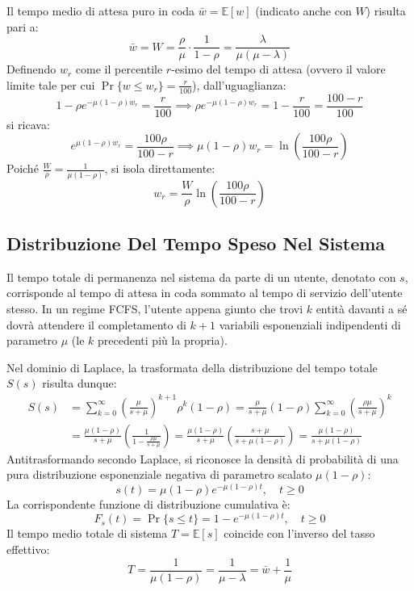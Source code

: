 \documentclass[11pt, a4paper]{article}
\begin{document}
Il tempo medio di attesa puro in coda $\bar{w} = \mathbb{E}[w]$ (indicato anche con $W$) risulta pari a:
\[
\boxed{\bar{w} = W = \frac{\rho}{\mu} \cdot \frac{1}{1 - \rho} = \frac{\lambda}{\mu(\mu - \lambda)}}
\]
Definendo $w_r$ come il percentile $r$-esimo del tempo di attesa (ovvero il valore limite tale per cui $\Pr\{w \le w_r\} = \frac{r}{100}$), dall'uguaglianza:
\[
1 - \rho e^{-\mu(1 - \rho)w_r} = \frac{r}{100} \implies \rho e^{-\mu(1 - \rho)w_r} = 1 - \frac{r}{100} = \frac{100 - r}{100}
\]
si ricava:
\[
e^{\mu(1 - \rho)w_r} = \frac{100\rho}{100 - r} \implies \mu(1 - \rho)w_r = \ln\left( \frac{100\rho}{100 - r} \right)
\]
Poiché $\frac{W}{\rho} = \frac{1}{\mu(1 - \rho)}$, si isola direttamente:
\[
\boxed{w_r = \frac{W}{\rho} \ln\left( \frac{100\rho}{100 - r} \right)}
\]

\subsection{Distribuzione Del Tempo Speso Nel Sistema}

Il tempo totale di permanenza nel sistema da parte di un utente, denotato con $s$, corrisponde al tempo di attesa in coda sommato al tempo di servizio dell'utente stesso. In un regime FCFS, l'utente appena giunto che trovi $k$ entità davanti a sé dovrà attendere il completamento di $k+1$ variabili esponenziali indipendenti di parametro $\mu$ (le $k$ precedenti più la propria).

Nel dominio di Laplace, la trasformata della distribuzione del tempo totale $S(s)$ risulta dunque:
\begin{align*}
S(s) &= \sum_{k=0}^{\infty} \left( \frac{\mu}{s + \mu} \right)^{k+1} \rho^k (1 - \rho) = \frac{\mu}{s + \mu}(1 - \rho) \sum_{k=0}^{\infty} \left( \frac{\rho \mu}{s + \mu} \right)^k \\
&= \frac{\mu(1 - \rho)}{s + \mu} \left( \frac{1}{1 - \frac{\rho \mu}{s + \mu}} \right) = \frac{\mu(1 - \rho)}{s + \mu} \left( \frac{s + \mu}{s + \mu(1 - \rho)} \right) = \frac{\mu(1 - \rho)}{s + \mu(1 - \rho)}
\end{align*}
Antitrasformando secondo Laplace, si riconosce la densità di probabilità di una pura distribuzione esponenziale negativa di parametro scalato $\mu(1 - \rho)$:
\[
\boxed{s(t) = \mu(1 - \rho) e^{-\mu(1 - \rho)t}, \quad t \ge 0}
\]
La corrispondente funzione di distribuzione cumulativa è:
\[
\boxed{F_s(t) = \Pr\{s \le t\} = 1 - e^{-\mu(1 - \rho)t}, \quad t \ge 0}
\]
Il tempo medio totale di sistema $T = \mathbb{E}[s]$ coincide con l'inverso del tasso effettivo:
\[
\boxed{T = \frac{1}{\mu(1 - \rho)} = \frac{1}{\mu - \lambda} = \bar{w} + \frac{1}{\mu}}
\]
\end{document}
